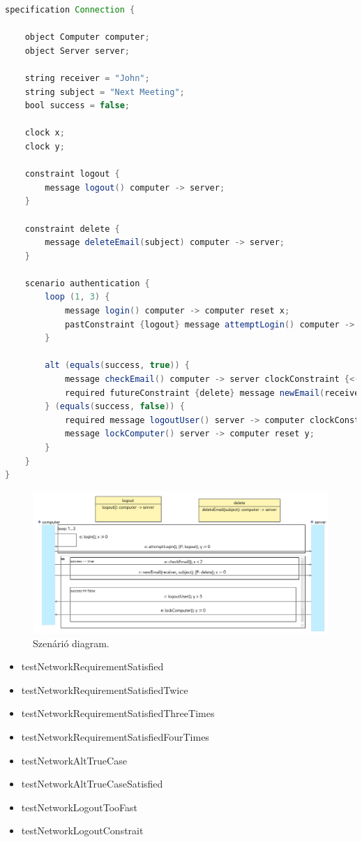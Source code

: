 \begin{lstlisting}[language=java, frame=single, float=ht!, caption={Integrációs teszteset.},captionpos=b]
specification Connection {

    object Computer computer;
    object Server server;

    string receiver = "John";
    string subject = "Next Meeting";
    bool success = false;

    clock x;
    clock y;

    constraint logout {
        message logout() computer -> server;
    }

    constraint delete {
        message deleteEmail(subject) computer -> server;
    }

    scenario authentication {
        loop (1, 3) {
            message login() computer -> computer reset x;
            pastConstraint {logout} message attemptLogin() computer -> server reset y;
        }

        alt (equals(success, true)) {
            message checkEmail() computer -> server clockConstraint {<(x, 2)};
            required futureConstraint {delete} message newEmail(receiver, subject) computer -> server reset x;
        } (equals(success, false)) {
            required message logoutUser() server -> computer clockConstraint {>(y, 3)};
            message lockComputer() server -> computer reset y;
        }
    }
}
\end{lstlisting}

\begin{figure}[!ht]
    \centering
    \includegraphics[width=150mm, keepaspectratio]{figures/diagramOperatorExample.png}
    \caption{Szenárió diagram.}
\end{figure}

\begin{itemize}
    \item testNetworkRequirementSatisfied
    \item testNetworkRequirementSatisfiedTwice
    \item testNetworkRequirementSatisfiedThreeTimes
    \item testNetworkRequirementSatisfiedFourTimes
    \item testNetworkAltTrueCase
    \item testNetworkAltTrueCaseSatisfied
    \item testNetworkLogoutTooFast
    \item testNetworkLogoutConstrait
\end{itemize}

